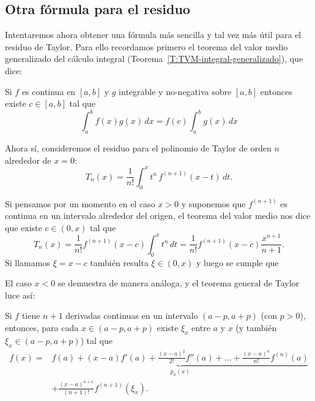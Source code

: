 
\subsection*{Otra fórmula para el residuo}

Intentaremos ahora obtener una fórmula más sencilla y tal vez más útil para el residuo de Taylor. Para ello recordamos primero el teorema del valor medio generalizado del cálculo integral (Teorema~\ref{T:TVM-integral-generalizado}), que dice:

\begin{theorem}
 Si $f$ es continua en $[a,b]$ y $g$ integrable y no-negativa sobre $[a,b]$ entonces existe $c \in [a,b]$ tal que 
\[
 \int_a^b f(x) g(x) \, dx = f(c) \int_a^b g(x)\, dx
\]
\end{theorem}

Ahora sí, consideremos el residuo para el polinomio de Taylor de orden $n$ alrededor de $x=0$:
\[
 T_n(x) = \frac{1}{n!} \int_0^x t^n \, f^{(n+1)}(x-t)\, dt.
\]

Si pensamos por un momento en el caso $x > 0$ y suponemos que $f^{(n+1)}$ es continua en un intervalo alrededor del origen, el teorema del valor medio nos dice que existe $c \in (0,x)$ tal que 
\[
 T_n(x) = \frac{1}{n!} f^{(n+1)}(x - c) \int_0^x t^n \, dt = \frac{1}{n!} f^{(n+1)}(x - c) \frac{x^{n+1}}{n+1}. 
\]
Si llamamos $\xi = x - c$ también resulta $\xi \in (0,x)$ y luego se cumple que

\recuadro{
\[
 T_n(x) = \frac{x^{n+1}}{(n+1)!} f^{(n+1)}(\xi),\qquad\text{para algún $\xi$ entre $0$ y $x$}.
\]
}

El caso $x<0$ se demuestra de manera análoga, y el teorema general de Taylor luce así:

\begin{theorem}
 Si $f$ tiene $n+1$ derivadas continuas en un intervalo $(a-p,a+p)$  (con $p > 0$), entonces, para cada $x \in (a-p,a+p)$ existe $\xi_x$ entre $a$ y $x$ (y también $\xi_x \in (a-p,a+p)$) tal que
\begin{align*}
  f(x) ={}& \underbrace{f(a) + (x-a) f'(a) + \frac{(x-a)^2}{2!} f''(a) %
  + \dots 
   +\frac{(x-a)^n}{n!} f^{(n)}(a) }_{p_n(x)}
   \\
   &+ \frac{(x-a)^{n+1}}{(n+1)!} f^{(n+1)}(\xi_x).
\end{align*}
\end{theorem}

